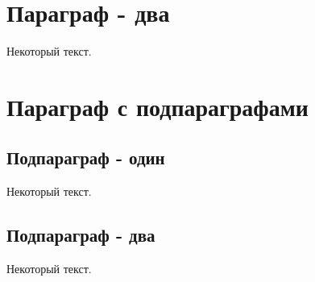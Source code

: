 
\section{Параграф - два} \label{sect4_2}

Некоторый текст.


\section{Параграф с подпараграфами} \label{sect4_3}

\subsection{Подпараграф - один} \label{subsect4_4_1}

Некоторый текст.

\subsection{Подпараграф - два} \label{subsect4_4_2}

Некоторый текст.

\clearpage